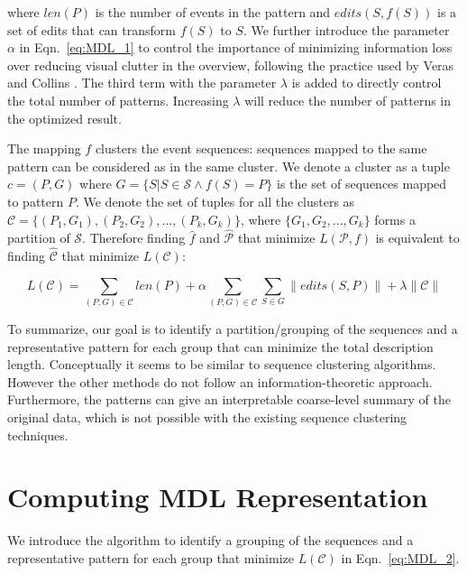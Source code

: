 where $len(P)$ is the number of events in the pattern and $edits(S,f(S))$ is a set of edits that can transform $f(S)$ to $S$. We further introduce the parameter $\alpha$ in Eqn.~\ref{eq:MDL_1} to control the importance of minimizing information loss over reducing visual clutter in the overview, following the practice used by Veras and Collins \cite{collins2017mdl}. The third term with the parameter $\lambda$ is added to directly control the total number of patterns. Increasing $\lambda$ will reduce the number of patterns in the optimized result.  

The mapping $f$ clusters the event sequences: sequences mapped to the same pattern can be considered as in the same cluster. We denote a cluster as a tuple $c = (P, G)$ where $G = \{S|S \in \mathscr{S} \wedge f(S) = P\}$ is the set of sequences mapped to pattern $P$. We denote the set of tuples for all the clusters as $\mathscr{C} = \{(P_1, G_1), (P_2, G_2), ..., (P_k, G_k)\}$, where $\{G_1, G_2, ..., G_k\}$ forms a partition of $\mathscr{S}$. Therefore finding $\hat{f}$ and $\hat{\mathscr{P}}$ that minimize $L(\mathscr{P},f)$ is equivalent to finding $\hat{\mathscr{C}}$ that minimize $L(\mathscr{C})$: 

\begin{equation}
	L(\mathscr{C}) = \sum_{(P, G) \in \mathscr{C}}len(P) + \alpha \sum_{(P, G) \in \mathscr{C}} \sum_{S \in G}\|edits(S, P)\| + \lambda\|\mathscr{C}\|
\label{eq:MDL_2}	
\end{equation}

To summarize, our goal is to identify a partition/grouping of the sequences and a representative pattern for each group that can minimize the total description length. Conceptually it seems to be similar to sequence clustering algorithms. However the other methods do not follow an information-theoretic approach. Furthermore, the patterns can give an interpretable coarse-level summary of the original data, which is not possible with the existing sequence clustering techniques. 

\section{Computing MDL Representation}
\label{section:algorithm}

We introduce the algorithm to identify a grouping of the sequences and a representative pattern for each group that minimize $L(\mathscr{C})$ in Eqn.~\ref{eq:MDL_2}. 

